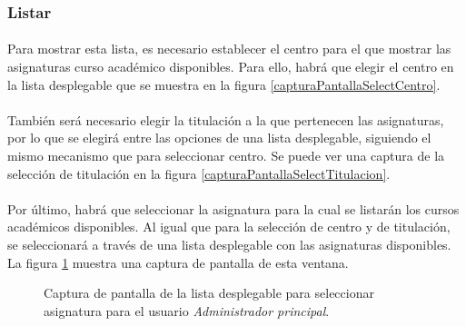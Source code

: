 \subsubsection{Listar}

  \paragraph{}Para mostrar esta lista, es necesario establecer el centro para
  el que mostrar las asignaturas curso académico disponibles. Para ello, habrá
  que elegir el centro en la lista desplegable que se muestra en la figura
  \ref{capturaPantallaSelectCentro}.

  \paragraph{}También será necesario elegir la titulación a la que pertenecen
  las asignaturas, por lo que se elegirá entre las opciones de una lista
  desplegable, siguiendo el mismo mecanismo que para seleccionar centro. Se
  puede ver una captura de la selección de titulación en la figura
  \ref{capturaPantallaSelectTitulacion}.

  \paragraph{}Por último, habrá que seleccionar la asignatura para la cual se
  listarán los cursos académicos disponibles. Al igual que para la selección de
  centro y de titulación, se seleccionará a través de una lista desplegable con
  las asignaturas disponibles. La figura \ref{capturaPantallaSelectAsignatura}
  muestra una captura de pantalla de esta ventana.

  \begin{figure}[!ht]
    \begin{center}
      \caption{Captura de pantalla de la lista desplegable para seleccionar asignatura para el usuario \textit{Administrador principal}.}
      \label{capturaPantallaSelectAsignatura}
    \end{center}
  \end{figure}

